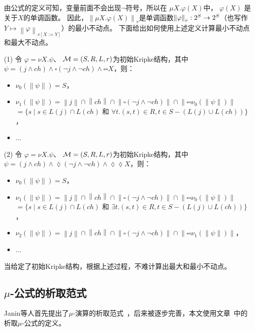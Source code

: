 由公式的定义可知，变量前面不会出现$\neg$符号，所以在 $\mu X. \varphi(X)$中， $\varphi(X)$ 是关于$X$的单调函数。
因此，$\left\| \mu X. \varphi(X)\right\|_v$是单调函数$\left\| \varphi \right\|_{v}: 2^S\rightarrow 2^S$（也写作$Y \mapsto \left\| \varphi\right\|_{v[X:=Y]}$）的最小不动点。
下面给出如何使用上述定义计算最小不动点和最大不动点。
\begin{example}
	(1) 令 $\varphi=\nu X. \psi$、 ${\cal M}=(S, R, L,r)$为初始Kripke结构，其中$\psi = (j \wedge ch) \wedge \square (\neg j \wedge \neg ch) \wedge \square \square X$，则：
	\begin{itemize}
		\item $\nu_0(\left\| \psi \right\|) = S$，
		\item $\nu_1(\left\| \psi \right\|) = \left\| j \right\| \cap \left\| ch \right\| \cap \left\| \square (\neg j \wedge \neg ch) \right\| \cap \left\| \square \square \nu_0(\left\| \psi \right\|) \right\|$ $=\{s \mid s \in L(j) \cap L(ch)$ 和 $\forall t. (s, t) \in R, t \in S - (L(j) \cup L(ch))\}$，
		\item ...
	\end{itemize}
	(2) 令 $\varphi=\nu X. \psi$、 ${\cal M}=(S, R, L,r)$为初始Kripke结构，其中$\psi=(j \wedge ch) \wedge \lozenge (\neg j \wedge \neg ch) \wedge \lozenge \lozenge X$，则：
	\begin{itemize}
		\item $\nu_0(\left\| \psi \right\|) = S$，
		\item $\nu_1(\left\| \psi \right\|) = \left\| j \right\| \cap \left\| ch \right\| \cap \left\| \square (\neg j \wedge \neg ch) \right\| \cap \left\| \square \square \nu_0(\left\| \psi \right\|) \right\|$ $=\{s \mid s \in L(j) \cap L(ch)$ 和 $\exists t. (s, t) \in R, t \in S - (L(j) \cup L(ch))\}$，
		\item $\nu_2(\left\| \psi \right\|) = \left\| j \right\| \cap \left\| ch \right\| \cap \left\| \square (\neg j \wedge \neg ch) \right\| \cap \left\| \square \square \nu_1(\left\| \psi \right\|) \right\|$，
		\item ...
	\end{itemize}
当给定了初始Kripke结构，根据上述过程，不难计算出最大和最小不动点。
\end{example}


\subsection{$\mu$-公式的析取范式}
Janin等人首先提出了$\mu$-演算的析取范式~\cite{janin1995automata}，后来被逐步完善，本文使用文章~\cite{d2006modal}中的析取$\mu$-公式的定义。

